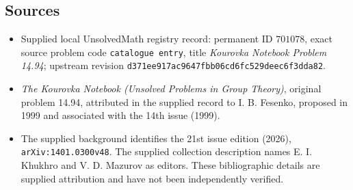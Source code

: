 \documentclass[11pt]{article}
\begin{document}
\subsection{Sources}
\begin{itemize}
\item Supplied local UnsolvedMath registry record: permanent ID \(701078\), exact source problem code \texttt{catalogue entry}, title \emph{Kourovka Notebook Problem 14.94}; upstream revision \texttt{d371ee917ac9647fbb06cd6fc529deec6f3dda82}.
\item \emph{The Kourovka Notebook (Unsolved Problems in Group Theory)}, original problem 14.94, attributed in the supplied record to I. B. Fesenko, proposed in 1999 and associated with the 14th issue (1999).
\item The supplied background identifies the 21st issue edition (2026), \texttt{arXiv:1401.0300v48}. The supplied collection description names E. I. Khukhro and V. D. Mazurov as editors. These bibliographic details are supplied attribution and have not been independently verified.
\end{itemize}
\end{document}
